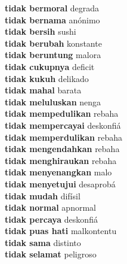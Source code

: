 \textbf{ tidak bermoral  } degrada \\
\textbf{ tidak bernama  } anónimo \\
\textbf{ tidak bersih  } sushi \\
\textbf{ tidak berubah  } konstante \\
\textbf{ tidak beruntung  } malora \\
\textbf{ tidak cukupnya  } deficit \\
\textbf{ tidak kukuh  } delikado \\
\textbf{ tidak mahal  } barata \\
\textbf{ tidak meluluskan  } nenga \\
\textbf{ tidak mempedulikan  } rebaha \\
\textbf{ tidak mempercayai  } deskonfiá \\
\textbf{ tidak memperdulikan  } rebaha \\
\textbf{ tidak mengendahkan  } rebaha \\
\textbf{ tidak menghiraukan  } rebaha \\
\textbf{ tidak menyenangkan  } malo \\
\textbf{ tidak menyetujui  } desaprobá \\
\textbf{ tidak mudah  } difísil \\
\textbf{ tidak normal  } apnormal \\
\textbf{ tidak percaya  } deskonfiá \\
\textbf{ tidak puas hati  } malkontentu \\
\textbf{ tidak sama  } distinto \\
\textbf{ tidak selamat  } peligroso \\
